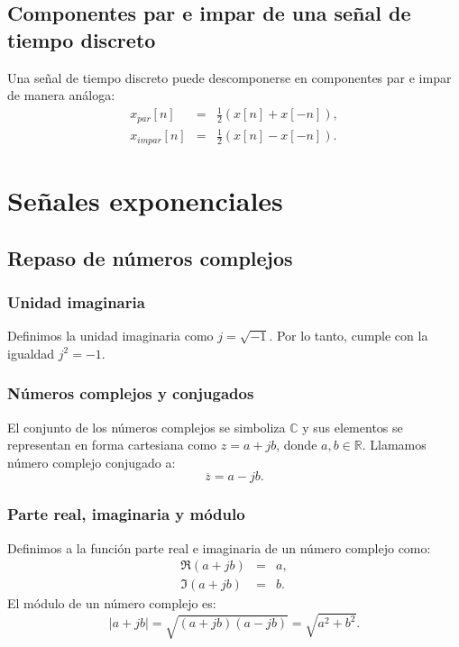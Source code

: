 \subsection{Componentes par e impar de una señal de tiempo discreto}
Una señal de tiempo discreto puede descomponerse en componentes par e impar de manera análoga:
\begin{eqnarray}
	x_{par}[n] &=& \frac{1}{2}\left( x[n] + x[-n] \right) , \\
	x_{impar}[n] &=& \frac{1}{2}\left( x[n] - x[-n] \right) .
\end{eqnarray}

\section{Señales exponenciales}

\subsection{Repaso de números complejos}

\subsubsection{Unidad imaginaria}
Definimos la unidad imaginaria como $j = \sqrt{-1}$. Por lo tanto, cumple con la igualdad $j^{2} = -1$.

\subsubsection{Números complejos y conjugados}
El conjunto de los números complejos se simboliza $\mathbb{C}$ y sus elementos se representan en forma cartesiana como $z = a + j b$, donde $a, b \in \mathbb{R}$. Llamamos número complejo conjugado a:
\begin{equation}
	\overline{z} = a - j b.
\end{equation}

\subsubsection{Parte real, imaginaria y módulo}
Definimos a la función parte real e imaginaria de un número complejo como:
\begin{eqnarray}
	\Re(a + j b) &=& a, \\
	\Im(a + j b) &=& b.
\end{eqnarray}
El módulo de un número complejo es:
\begin{equation}
	|a + j b| = \sqrt{(a + j b)(a - j b)} = \sqrt{a^{2} + b^{2}}.
\end{equation}

